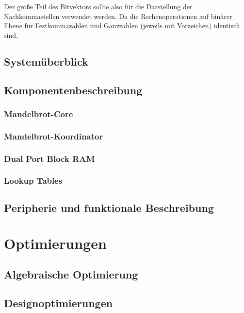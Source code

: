 \documentclass[a4paper,12pt,onesided]{report}
\begin{document}
Der große Teil des Bitvektors sollte also für die Darstellung der Nachkommastellen verwendet werden. Da die Rechenoperationen auf binärer Ebene für Festkommazahlen und Ganzzahlen (jeweils mit Vorzeichen) identisch sind, 

\section{Systemüberblick}
\label{sec:überblick}

\section{Komponentenbeschreibung}
\subsection{Mandelbrot-Core}
\subsection{Mandelbrot-Koordinator}
\subsection{Dual Port Block RAM}
\subsection{Lookup Tables}
\section{Peripherie und funktionale Beschreibung}

\chapter{Optimierungen}
\section{Algebraische Optimierung}
\section{Designoptimierungen}

{}

\end{document}
